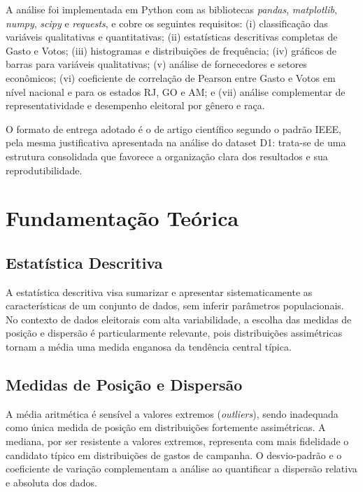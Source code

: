 \documentclass[conference]{IEEEtran}
\begin{document}
A análise foi implementada em Python com as bibliotecas \textit{pandas},
\textit{matplotlib}, \textit{numpy}, \textit{scipy} e \textit{requests},
e cobre os seguintes requisitos: (i) classificação das variáveis qualitativas
e quantitativas; (ii) estatísticas descritivas completas de Gasto e Votos;
(iii) histogramas e distribuições de frequência; (iv) gráficos de barras para
variáveis qualitativas; (v) análise de fornecedores e setores econômicos;
(vi) coeficiente de correlação de Pearson entre Gasto e Votos em nível nacional
e para os estados RJ, GO e AM; e (vii) análise complementar de representatividade
e desempenho eleitoral por gênero e raça.

O formato de entrega adotado é o de artigo científico segundo o padrão IEEE,
pela mesma justificativa apresentada na análise do dataset D1: trata-se de uma
estrutura consolidada que favorece a organização clara dos resultados e sua
reprodutibilidade.

\section{Fundamentação Teórica}

\subsection{Estatística Descritiva}

A estatística descritiva visa sumarizar e apresentar sistematicamente as
características de um conjunto de dados, sem inferir parâmetros populacionais.
No contexto de dados eleitorais com alta variabilidade, a escolha das medidas
de posição e dispersão é particularmente relevante, pois distribuições
assimétricas tornam a média uma medida enganosa da tendência central típica.

\subsection{Medidas de Posição e Dispersão}

A média aritmética é sensível a valores extremos (\textit{outliers}), sendo
inadequada como única medida de posição em distribuições fortemente assimétricas.
A mediana, por ser resistente a valores extremos, representa com mais fidelidade
o candidato típico em distribuições de gastos de campanha. O desvio-padrão e o
coeficiente de variação complementam a análise ao quantificar a dispersão relativa
e absoluta dos dados.
\end{document}
